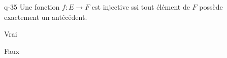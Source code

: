 \begin{truefalse}{q-35}
Une fonction $f : E\to F$ est injective ssi tout élément de $F$ possède exactement un antécédent.
\item Vrai
\item* Faux
\end{truefalse}


